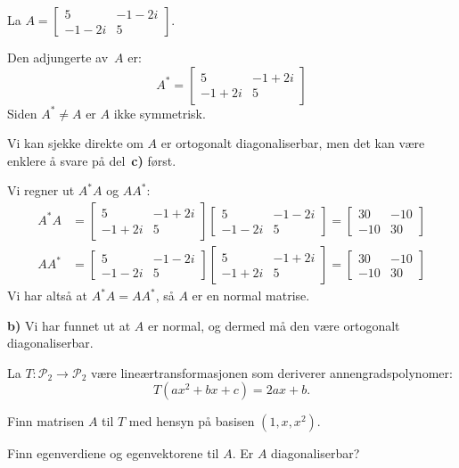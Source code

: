 \begin{losning}
La 
$
A=
\begin{bmatrix}
5 &-1-2i \\-1-2i & 5
\end{bmatrix}.
$
\begin{punkt}
Den adjungerte av~$A$ er:
\[
A^* =
\begin{bmatrix}
5     & -1+2i \\
-1+2i & 5
\end{bmatrix}
\]
Siden $A^* \ne A$ er $A$ ikke symmetrisk.
\end{punkt}
\begin{punkt}
Vi kan sjekke direkte om $A$ er ortogonalt diagonaliserbar, men det
kan være enklere å svare på del~\textbf{c)} først.
\end{punkt}
\begin{punkt}
Vi regner ut $A^* A$ og $A A^*$:
\begin{align*}
A^* A &=
\begin{bmatrix}
5     & -1+2i \\
-1+2i & 5
\end{bmatrix}
\begin{bmatrix}
5 &-1-2i \\
-1-2i & 5
\end{bmatrix}
=
\begin{bmatrix}
 30 & -10 \\
-10 & 30
\end{bmatrix}
\\
A A^* &=
\begin{bmatrix}
5 &-1-2i \\
-1-2i & 5
\end{bmatrix}
\begin{bmatrix}
5     & -1+2i \\
-1+2i & 5
\end{bmatrix}
=
\begin{bmatrix}
 30 & -10 \\
-10 & 30
\end{bmatrix}
\end{align*}
Vi har altså at $A^* A = A A^*$, så $A$ er en normal matrise.
\end{punkt}
\textbf{b)} Vi har funnet ut at $A$ er normal, og dermed må den være
ortogonalt diagonaliserbar.
\end{losning}


\begin{oppgave}
La $T:\mathcal{P}_2\rightarrow \mathcal{P}_2$ være lineærtransformasjonen som deriverer annengradspolynomer: $$T(ax^2+bx+c)=2ax+b.$$

\begin{punkt}
Finn matrisen $A$ til $T$ med hensyn på basisen $(1,x,x^2)$.
\end{punkt}

\begin{punkt}
Finn egenverdiene og egenvektorene til $A$. Er $A$ diagonaliserbar?
\end{punkt}

\end{oppgave}

